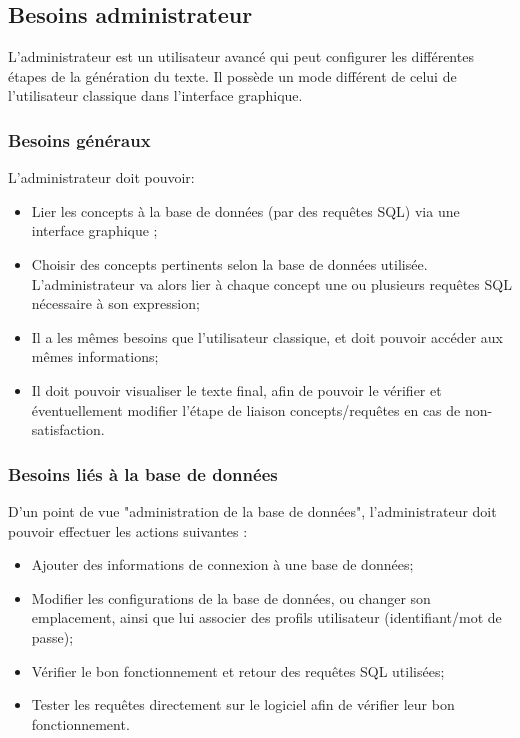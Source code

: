 \documentclass[12pt]{report}
\begin{document}
\subsection{Besoins administrateur}

L'administrateur est un utilisateur avancé qui peut configurer les différentes étapes de la génération du texte. Il possède un mode différent de celui de l'utilisateur classique dans l'interface graphique.

\subsubsection{Besoins généraux}

L'administrateur doit pouvoir:

\begin{itemize}

\item Lier les concepts à la base de données (par des requêtes SQL) via une interface graphique ;
\item Choisir des concepts pertinents selon la base de données utilisée. L'administrateur va alors lier à chaque concept une ou plusieurs requêtes SQL nécessaire à son expression;
\item Il a les mêmes besoins que l'utilisateur classique, et doit pouvoir accéder aux mêmes informations;
\item Il doit pouvoir visualiser le texte final, afin de pouvoir le vérifier et éventuellement modifier l'étape de liaison concepts/requêtes en cas de non-satisfaction.
\end{itemize} 

\subsubsection{Besoins liés à la base de données}

D'un point de vue "administration de la base de données", l'administrateur doit pouvoir effectuer les actions suivantes :

\begin{itemize}

\item Ajouter des informations de connexion à une base de données;
\item Modifier les configurations de la base de données, ou changer son emplacement, ainsi que lui associer des profils utilisateur (identifiant/mot de passe);
\item Vérifier le bon fonctionnement et retour des requêtes SQL utilisées;
\item Tester les requêtes directement sur le logiciel afin de vérifier leur bon fonctionnement.
\end{itemize} 
\end{document}
